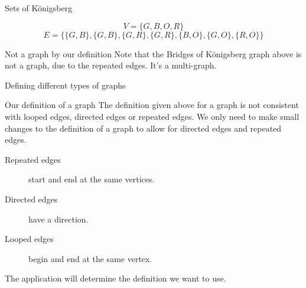 \begin{frame}{Sets of K{\"o}nigsberg}
  \begin{adjustbox}{width={0.4\textwidth},center} 
  \end{adjustbox}
  \vspace{-2mm}
  $$V = \{G, B, O, R\}$$
  \vspace{-6mm}
  $$E = \{\{G, B\}, \{G, B\}, \{G, R\},\{G, R\}, \{B, O\}, \{G, O\},\{R, O\}\}$$

  \begin{alertblock}{Not a graph by our definition}
    Note that the Bridges of K{\"o}nigsberg graph above is not a graph, due to the repeated edges.
    It's a multi-graph.
  \end{alertblock}
\end{frame}

\begin{frame}{Defining different types of graphs}
  
  \begin{alertblock}{Our definition of a graph}
  The definition given above for a graph is not consistent with looped edges, directed edges or repeated edges. We only need to make small changes to the definition of a graph to allow for directed edges and repeated edges.
  \end{alertblock}
  
  \begin{description}
    \item[Repeated edges] start and end at the same vertices.
    \item[Directed edges] have a direction.
    \item[Looped edges] begin and end at the same vertex.
  \end{description}
  
  The application will determine the definition we want to use.
\end{frame}



